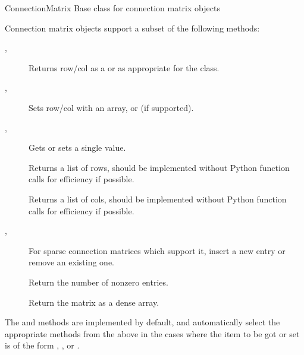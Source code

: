 \documentclass[letterpaper,10pt,english]{manual}
\begin{document}
\hypertarget{brian.ConnectionMatrix}{}\begin{classdesc}{ConnectionMatrix}{}
Base class for connection matrix objects

Connection matrix objects support a subset of the following methods:
\begin{description}
\item[, ] \leavevmode
Returns row/col  as a \hyperlink{brian.DenseConnectionVector}{} or
\hyperlink{brian.SparseConnectionVector}{} as appropriate for the class.

\item[, ] \leavevmode
Sets row/col with an array, \hyperlink{brian.DenseConnectionVector}{} or
\hyperlink{brian.SparseConnectionVector}{} (if supported).

\item[, ] \leavevmode
Gets or sets a single value.

\item[] \leavevmode
Returns a list of rows, should be implemented without Python
function calls for efficiency if possible.

\item[] \leavevmode
Returns a list of cols, should be implemented without Python
function calls for efficiency if possible.

\item[, ] \leavevmode
For sparse connection matrices which support it, insert a new
entry or remove an existing one.

\item[] \leavevmode
Return the number of nonzero entries.

\item[] \leavevmode
Return the matrix as a dense array.

\end{description}

The  and  methods are implemented by
default, and automatically select the appropriate methods from the
above in the cases where the item to be got or set is of the form
\code{:}, ,  or .
\end{classdesc}
\end{document}
